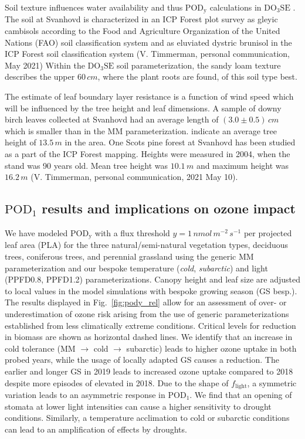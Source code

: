 \documentclass[bg, manuscript]{copernicus}
\begin{document}
Soil texture influences water availability and thus $\mathrm{POD_y}$ calculations in $\mathrm{DO_3SE}$ \citep{ACP:Bueker2012}. The soil at Svanhovd is characterized in an ICP Forest plot survey as gleyic cambisols according to the Food and Agriculture Organization of the United Nations (FAO) soil classification system and as eluviated dystric brunisol in the ICP Forest soil classification system (V. Timmerman, personal communication, May 2021) Within the $\mathrm{DO_3SE}$ soil parameterization, the sandy loam texture describes the upper $60\,\unit{cm}$, where the plant roots are found, of this soil type best. 

The estimate of leaf boundary layer resistance is a function of wind speed which will be influenced by the tree height and leaf dimensions. A sample of downy birch leaves collected at Svanhovd had an average length of $(3.0\pm 0.5)\,\unit{cm}$ which is smaller than in the MM parameterization. \citet[][p.~52]{NINA2004} indicate an average tree height of $13.5\,\unit{m}$ in the area. One Scots pine forest at Svanhovd has been studied as a part of the ICP Forest mapping. Heights were measured in 2004, when the stand was 90 years old. Mean tree height was $10.1\,\unit{m}$ and maximum height was $16.2\,\unit{m}$ (V. Timmerman, personal communication, 2021 May 10).

\subsection{$\mathrm{POD_1}$ results and implications on ozone impact}
\label{subsec:do3se_results}

We have modeled $\mathrm{POD_y}$ with a flux threshold $y=1\,\unit{nmol\,m^{-2}\,s^{-1}}$ per projected leaf area (PLA) for the three natural/semi-natural vegetation types, deciduous trees, coniferous trees, and perennial grassland using the generic MM parameterization and our bespoke temperature (\emph{cold}, \emph{subarctic}) and light (PPFD0.8, PPFD1.2) parameterizations. Canopy height and leaf size are adjusted to local values in the model simulations with bespoke growing season (GS besp.). The results displayed in Fig.~\ref{fig:pody_rel} allow for an assessment of over- or underestimation of ozone risk arising from the use of generic parameterizations established from less climatically extreme conditions.
Critical levels for reduction in biomass \citep[deciduous forest $4\,\unit{\%}$, coniferous forest $2\,\unit{\%}$, and grasslands $10\,\unit{\%}$ biomass reduction,][]{ICP:MappingManual2017,ESPR:Hayes2021} are shown as horizontal dashed lines. We identify that an increase in cold tolerance (MM $\rightarrow$ cold $\rightarrow$ subarctic) leads to higher ozone uptake in both probed years, while the usage of locally adapted GS causes a reduction. The earlier and longer GS in 2019 leads to increased ozone uptake compared to 2018 despite more episodes of elevated \chem{[O_3]} in 2018. Due to the shape of $f_\mathrm{light}$, a symmetric variation leads to an asymmetric response in $\mathrm{POD_1}$. We find that an opening of stomata at lower light intensities can cause a higher sensitivity to drought conditions. Similarly, a temperature acclimation to cold or subarctic conditions can lead to an amplification of effects by droughts. 
\end{document}
